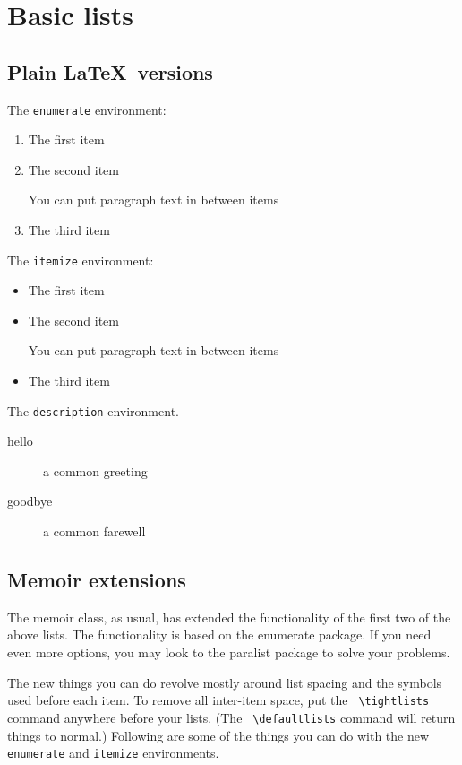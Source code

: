 \documentclass[12pt,article]{memoir}
\begin{document}
\chapter*{Basic lists}

\section*{Plain \LaTeX\ versions}

The \texttt{enumerate} environment:

\begin{enumerate}
	\item The first item
	\item The second item
	
	You can put paragraph text in between items
	
	\item The third item
\end{enumerate}

\noindent The \texttt{itemize} environment:

\begin{itemize}
	\item The first item
	\item The second item
	
	You can put paragraph text in between items
	
	\item The third item
\end{itemize}

\noindent The \texttt{description} environment.

\begin{description}
	\item[hello] a common greeting
	\item[goodbye] a common farewell
\end{description}

\section*{\textsf{Memoir} extensions}

The \textsf{memoir} class, as usual, has extended the functionality of the first two of the above lists. The functionality is based on the \textsf{enumerate} package. If you need even more options, you may look to the \textsf{paralist} package to solve your problems.

The new things you can do revolve mostly around list spacing and the symbols used before each item. To remove all inter-item space, put the \verb| \tightlists| command anywhere before your lists. (The \verb| \defaultlists| command will return things to normal.) Following are some of the things you can do with the new \texttt{enumerate} and \texttt{itemize} environments.
\end{document}
